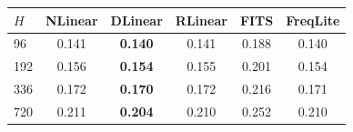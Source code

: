 \begin{tabular}{lccccc}
\toprule
$H$ & NLinear & DLinear & RLinear & FITS & FreqLite \\
\midrule
96 & 0.141 & \textbf{0.140} & 0.141 & 0.188 & 0.140 \\
192 & 0.156 & \textbf{0.154} & 0.155 & 0.201 & 0.154 \\
336 & 0.172 & \textbf{0.170} & 0.172 & 0.216 & 0.171 \\
720 & 0.211 & \textbf{0.204} & 0.210 & 0.252 & 0.210 \\
\bottomrule
\end{tabular}